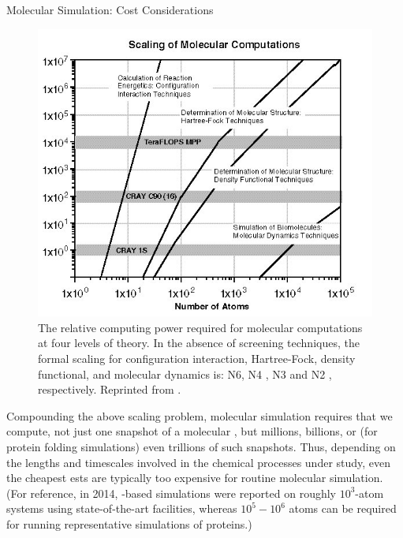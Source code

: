 \begin{section}{Molecular Simulation: Cost Considerations}
\begin{figure}
\centering
\includegraphics[width=\textwidth]{intro/scale.png}
\caption{
The relative computing power required for molecular computations at four
levels of theory. In the absence of screening techniques, the formal scaling
for configuration interaction, Hartree-Fock, density functional, and molecular
dynamics is: N6, N4 , N3 and N2 , respectively.
Reprinted from .
    }
\label{fig:intro-scaling}
\end{figure}

Compounding the above scaling problem, molecular simulation requires that we
compute,
not just one snapshot of a molecular \pes, but millions, billions, or 
(for protein folding simulations) even trillions of such snapshots.
Thus, depending on the lengths and timescales
involved in the chemical processes under study, even the cheapest \dft \glspl{est}
are typically too expensive for routine molecular simulation.
(For reference, in 2014, \dft-based simulations were reported on 
roughly $10^3$-atom systems using state-of-the-art facilities,
\cite{Ballone2014}
whereas $10^5-10^6$ atoms can be required for running representative
simulations of proteins.\cite{Karplus2002,Lane2013})


\end{section}
